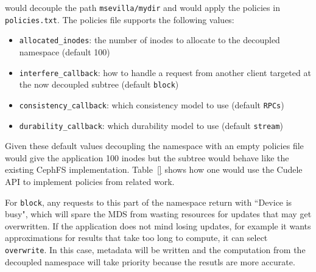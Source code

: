 would decouple the path \texttt{msevilla/mydir} and would apply the policies in
\texttt{policies.txt}. The policies file supports the following values:

\begin{itemize}

  \item \texttt{allocated\_inodes}: the number of inodes to allocate to the
  decoupled namespace (default 100)

  \item \texttt{interfere\_callback}: how to handle a request from another
  client targeted at the now decoupled subtree (default \texttt{block})

  \item \texttt{consistency\_callback}: which consistency model to use (default
  \texttt{RPCs})

  \item \texttt{durability\_callback}: which durability model to use (default
  \texttt{stream})

\end{itemize}

Given these default values decoupling the namespace with an empty policies file
would give the application 100 inodes but the subtree would behave like the
existing CephFS implementation. Table~\ref{} shows how one would use the Cudele
API to implement policies from related work. 


%

For \texttt{block}, any requests to this part of the namespace return with
``Device is busy", which will spare the MDS from wasting resources for updates
that may get overwritten. If the application does not mind losing updates, for
example it wants approximations for results that take too long to compute, it
can select \texttt{overwrite}. In this case, metadata will be written and the
computation from the decoupled namespace will take priority because the resutls
are more accurate.

%


